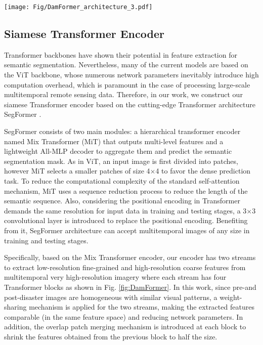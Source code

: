 \documentclass{article}
\begin{document}
\begin{figure*}[ht]

  \centering
  \texttt{[image: Fig/DamFormer\_architecture\_3.pdf]}
  \caption{Overview of the proposed DamFormer architecture. }
  \label{fig:DamFormer}
\end{figure*}

\subsection{Siamese Transformer Encoder}\label{sec:2.1}
\par Transformer backbones have shown their potential in feature extraction for semantic segmentation. Nevertheless, many of the current models are based on the ViT backbone, whose numerous network parameters inevitably introduce high computation overhead, which is paramount in the case of processing large-scale multitemporal remote sensing data. Therefore, in our work, we construct our siamese Transformer encoder based on the cutting-edge Transformer architecture SegFormer \cite{xie2021segformer}.

\par SegFormer consists of two main modules: a hierarchical transformer encoder named Mix Transformer (MiT) that outputs multi-level features and a lightweight All-MLP decoder to aggregate them and predict the semantic segmentation mask. As in ViT, an input image is first divided into patches, however MiT selects a smaller patches of size  4$\times$4 to favor the dense prediction task.  To reduce the computational complexity of the standard self-attention mechanism, MiT uses a sequence reduction process to reduce the length of the semantic sequence. Also, considering the positional encoding in Transformer demands the same resolution for input data in training and testing stages, a 3$\times$3 convolutional layer is introduced to replace the positional encoding. Benefiting from it, SegFormer architecture can accept multitemporal images of any size in training and testing stages. 

\par Specifically, based on the Mix Transformer encoder, our encoder has two streams to extract low-resolution fine-grained and high-resolution coarse features from multitemporal very high-resolution imagery where each stream has four Transformer blocks as shown in Fig. \ref{fig:DamFormer}. In this work, since pre-and post-disaster images are homogeneous with similar visual patterns, a weight-sharing mechanism is applied for the two streams, making the extracted features comparable (in the same feature space) and reducing network parameters. In addition, the overlap patch merging mechanism \cite{xie2021segformer} is introduced at each block to shrink the features obtained from the previous block to half the size. 
\end{document}
